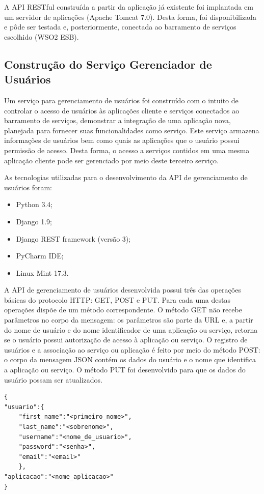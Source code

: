 A API RESTful construída a partir da aplicação já existente foi implantada em um servidor de aplicações (Apache Tomcat 7.0). Desta forma, foi disponibilizada e pôde ser testada e, posteriormente, conectada ao barramento de serviços escolhido (WSO2 ESB).

\subsection{Construção do Serviço Gerenciador de Usuários}
Um serviço para gerenciamento de usuários foi construído com o intuito de controlar o acesso de usuários às aplicações cliente e serviços conectados ao barramento de serviços, demonstrar a integração de uma aplicação nova, planejada para fornecer suas funcionalidades como serviço. Este serviço armazena informações de usuários bem como quais as aplicações que o usuário possui permissão de acesso. Desta forma, o acesso a serviços contidos em uma mesma aplicação cliente pode ser gerenciado por meio deste terceiro serviço.

As tecnologias utilizadas para o desenvolvimento da API de gerenciamento de usuários foram:
\begin{itemize}
\item Python 3.4;
\item Django 1.9;
\item Django REST framework (versão 3);
\item PyCharm IDE;
\item Linux Mint 17.3.
\end{itemize}

A API de gerenciamento de usuários desenvolvida possui três das operações básicas do protocolo HTTP: GET, POST e PUT. Para cada uma destas operações dispõe de um método correspondente. O método GET não recebe parâmetros no corpo da mensagem: os parâmetros são parte da URL e, a partir do nome de usuário e do nome identificador de uma aplicação ou serviço, retorna se o usuário possui autorização de acesso à aplicação ou serviço. O registro de usuários e a associação ao serviço ou aplicação é feito por meio do método POST: o corpo da mensagem JSON contém os dados do usuário e o nome que identifica a aplicação ou serviço. O método PUT foi desenvolvido para que os dados do usuário possam ser atualizados.


\begin{lstlisting}[caption={Formato de mensagem recebido pelo serviço de gerenciamento de usuários (método POST).},label={lst:msgloginpost}]
{
"usuario":{
	"first_name":"<primeiro_nome>",
	"last_name":"<sobrenome>",
	"username":"<nome_de_usuario>",
	"password":"<senha>",
	"email":"<email>"
	},
"aplicacao":"<nome_aplicacao>"
}
\end{lstlisting}

